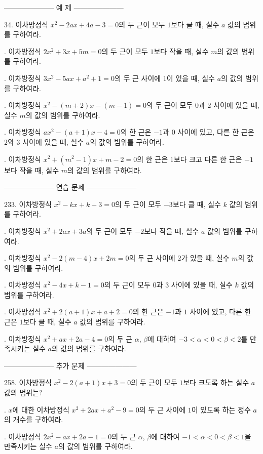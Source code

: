 \documentclass{article}
\begin{document}
\newpage
--------------------- 예 제 ---------------------

34.
이차방정식 \(x^2-2ax+4a-3=0\)의 두 근이 모두 \(1\)보다 클 때, 실수 \(a\) 값의 범위를 구하여라.

.
이차방정식 \(2x^2+3x+5m=0\)의 두 근이 모두 \(1\)보다 작을 때, 실수 \(m\)의 값의 범위를 구하여라.

.
이차방정식 \(3x^2-5ax+a^2+1=0\)의 두 근 사이에 \(1\)이 있을 때, 실수 \(a\)의 값의 범위를 구하여라.

.
이차방정식 \(x^2-(m+2)x-(m-1)=0\)의 두 근이 모두 \(0\)과 \(2\) 사이에 있을 때, 실수 \(m\)의 값의 범위를 구하여라.

.
이차방정식 \(ax^2-(a+1)x-4=0\)의 한 근은 \(-1\)과 \(0\) 사이에 있고, 다른 한 근은 \(2\)와 \(3\) 사이에 있을 때, 실수 \(a\)의 값의 범위를 구하여라.

. 이차방정식 \(x^2+(m^2-1)x+m-2=0\)의 한 근은 \(1\)보다 크고 다른 한 근은 \(-1\)보다 작을 때, 실수 \(m\)의 값의 범위를 구하여라.

\bigskip\bigskip
--------------------- 연습 문제 ---------------------

233.
이차방정식 \(x^2-kx+k+3=0\)의 두 근이 모두 \(-3\)보다 클 때, 실수 \(k\) 값의 범위를 구하여라.

.
이차방정식 \(x^2+2ax+3a\)의 두 근이 모두 \(-2\)보다 작을 때, 실수 \(a\) 값의 범위를 구하여라.

.
이차방정식 \(x^2-2(m-4)x+2m=0\)의 두 근 사이에 \(2\)가 있을 때, 실수 \(m\)의 값의 범위를 구하여라.

.
이차방정식 \(x^2-4x+k-1=0\)의 두 근이 모두 \(0\)과 \(3\) 사이에 있을 때, 실수 \(k\) 값의 범위를 구하여라.

.
이차방정식 \(x^2+2(a+1)x+a+2=0\)의 한 근은 \(-1\)과 \(1\) 사이에 있고, 다른 한 근은 \(1\)보다 클 때, 실수 \(a\) 값의 범위를 구하여라.

.
이차방정식 \(x^2+ax+2a-4=0\)의 두 근 \(\alpha\), \(\beta\)에 대하여 \(-3<\alpha<0<\beta<2\)를 만족시키는 실수 \(a\)의 값의 범위를 구하여라.

--------------------- 추가 문제 ---------------------

258.
이차방정식 \(x^2-2(a+1)x+3=0\)의 두 근이 모두 \(1\)보다 크도록 하는 실수 \(a\) 값의 범위는?

.
\(x\)에 대한 이차방정식 \(x^2+2ax+a^2-9=0\)의 두 근 사이에 \(1\)이 있도록 하는 정수 \(a\)의 개수를 구하여라.

.
이차방정식 \(2x^2-ax+2a-1=0\)의 두 근 \(\alpha\), \(\beta\)에 대하여 \(-1<\alpha<0<\beta<1\)을 만족시키는 실수 \(a\)의 값의 범위를 구하여라.
\end{document}
